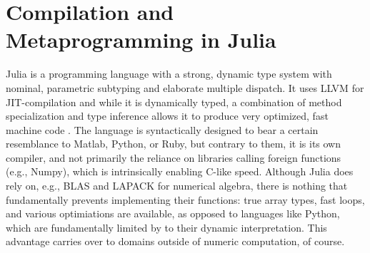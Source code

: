\section{Compilation and Metaprogramming in Julia}
\label{sec:comp-metapr-julia}

Julia \parencite{bezanson2017julia} is a programming language with a strong, dynamic type system
with nominal, parametric subtyping and elaborate multiple dispatch.  It uses LLVM
\parencite{llvmproject2019llvm} for JIT-compilation and while it is dynamically typed, a combination
of method specialization and type inference allows it to produce very optimized, fast machine code
\parencite{bezanson2018julia}.  The language is syntactically designed to bear a certain resemblance
to Matlab, Python, or Ruby, but contrary to them, it is its own compiler, and not primarily the
reliance on libraries calling foreign functions (e.g., Numpy), which is intrinsically enabling
C-like speed.  Although Julia does rely on, e.g., BLAS and LAPACK for numerical algebra, there is
nothing that fundamentally prevents implementing their functions: true array types, fast loops, and
various optimiations are available, as opposed to languages like Python, which are fundamentally
limited by to their dynamic interpretation.  This advantage carries over to domains outside of
numeric computation, of course.

